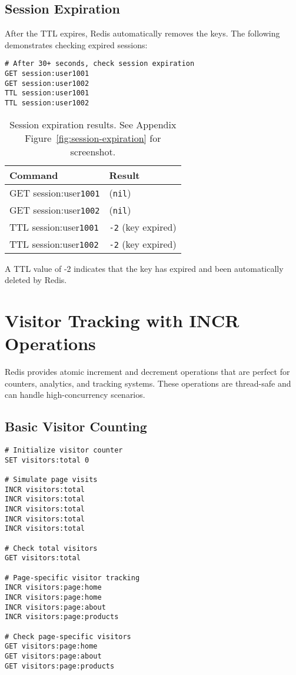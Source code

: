 \subsection{Session Expiration}

After the TTL expires, Redis automatically removes the keys. The following demonstrates checking expired sessions:

\begin{verbatim}
# After 30+ seconds, check session expiration
GET session:user1001
GET session:user1002
TTL session:user1001
TTL session:user1002
\end{verbatim}

\begin{table}[H]
  \centering
  \begin{tabular}{|l|l|}
    \hline
    \textbf{Command} & \textbf{Result} \\
    \hline
    GET session:user\texttt{1001} & (\texttt{nil}) \\
    GET session:user\texttt{1002} & (\texttt{nil}) \\
    TTL session:user\texttt{1001} & \texttt{-2} (key expired) \\
    TTL session:user\texttt{1002} & \texttt{-2} (key expired) \\
    \hline
  \end{tabular}
  \caption{Session expiration results. See Appendix Figure~\ref{fig:session-expiration} for screenshot.}
\end{table}

A TTL value of -2 indicates that the key has expired and been automatically deleted by Redis.

\section{Visitor Tracking with INCR Operations}

Redis provides atomic increment and decrement operations that are perfect for counters, analytics, and tracking systems. These operations are thread-safe and can handle high-concurrency scenarios.

\subsection{Basic Visitor Counting}

\begin{verbatim}
# Initialize visitor counter
SET visitors:total 0

# Simulate page visits
INCR visitors:total
INCR visitors:total
INCR visitors:total
INCR visitors:total
INCR visitors:total

# Check total visitors
GET visitors:total

# Page-specific visitor tracking
INCR visitors:page:home
INCR visitors:page:home
INCR visitors:page:about
INCR visitors:page:products

# Check page-specific visitors
GET visitors:page:home
GET visitors:page:about
GET visitors:page:products
\end{verbatim}

